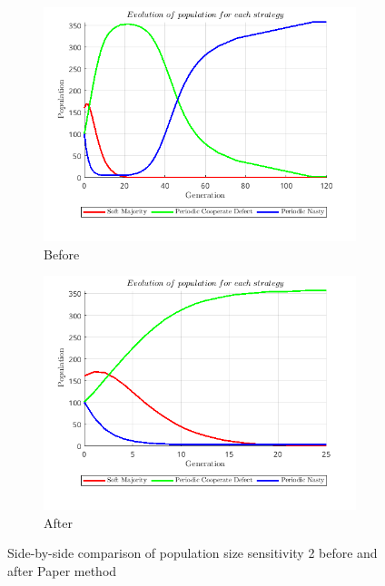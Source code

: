 \documentclass[12pt]{report}
\begin{document}
\begin{figure}[H]
    \centering
    \begin{subfigure}[t]{0.45\textwidth}
        \centering
        \includegraphics[width=\textwidth]{population_size_sensitivity_2_before_paper.png}
        \caption{Before}
    \end{subfigure}
    \hfill
    \begin{subfigure}[t]{0.45\textwidth}
        \centering
        \includegraphics[width=\textwidth]{population_size_sensitivity_2_after_paper.png}
        \caption{After}
    \end{subfigure}
    \caption{Side-by-side comparison of population size sensitivity 2 before and after Paper method}
\end{figure}
\end{document}
